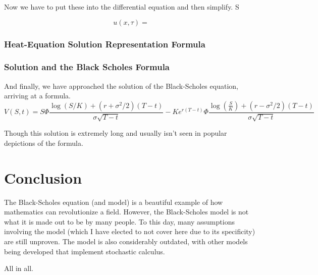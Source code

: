\documentclass{article}
\begin{document}
Now we have to put these into the differential equation and then simplify. 
S



\begin{equation}
    u(x, \tau) = 
\end{equation}

\subsubsection*{Heat-Equation Solution Representation Formula}




\subsubsection*{Solution and the Black Scholes Formula}


And finally, we have approached the solution of the Black-Scholes equation, arriving at a formula. 
\begin{equation}
    V(S,t) = S\Phi \frac{\log{(S/K)} + (r + \sigma^2/2)(T-t)}{\sigma \sqrt{T-t}}
    - Ke^{r(T-t)} \Phi \frac{\log{(\frac{S}{K})} + (r-\sigma^{2}/2)(T-t)}{\sigma \sqrt{T-t}}
\end{equation}

Though this solution is extremely long and usually isn't seen in popular depictions of the formula. 






\section*{Conclusion}

The Black-Scholes equation (and model) is a beautiful example of how mathematics can revolutionize a field. 
However, the Black-Scholes model is not what it is made out to be by many people. To this day, many assumptions involving the model 
(which I have elected to not cover here due to its specificity) are still unproven. The model is also considerably outdated, with other models being developed
that implement stochastic calculus. 

All in all. 
\end{document}
